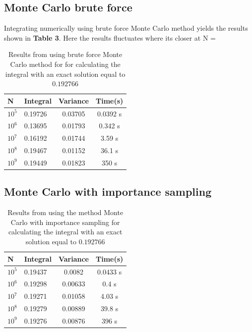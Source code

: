 \documentclass[twoside,twocolumn]{article}
\begin{document}
\subsection{Monte Carlo brute force}
Integrating numerically using brute force Monte Carlo method yields the results shown in \textbf{Table 3}. Here the results fluctuates where its closer at N = 
\begin{table}[h]
\centering
\begin{tabular}{|l|l|c|c|}
\hline
N                     & Integral & \multicolumn{1}{l|}{Variance} & Time(s)  \\ \hline
$10^5$ & 0.19726  & 0.03705                       & 0.0392 s \\ \hline
$10^6$ & 0.13695  & 0.01793                       & 0.342 s  \\ \hline
$10^7$ & 0.16192  & 0.01744                       & 3.59 s   \\ \hline
$10^8$ &0.19467  & 0.01152                       & 36.1 s   \\ \hline
$10^9$ & 0.19449  & 0.01823                       & 350 s    \\ \hline
\end{tabular}
\caption{Results from using brute force Monte Carlo method for for calculating the integral with an exact solution equal to $0.192766$}
\end{table}

\subsection{Monte Carlo with importance sampling}
\begin{table}[h]
\centering
\begin{tabular}{|l|l|c|c|}
\hline
N                     & Integral & \multicolumn{1}{l|}{Variance} & Time(s)  \\ \hline
$10^5$ & 0.19437  & 0.0082                        & 0.0433 s \\ \hline
$10^6$ & 0.19298  & 0.00633                       & 0.4 s    \\ \hline
$10^7$ & 0.19271  & 0.01058                       & 4.03 s   \\ \hline
$10^8$ & 0.19279  & 0.00889                       & 39.8 s   \\ \hline
$10^9$ & 0.19276  & 0.00876                       & 396 s    \\ \hline
\end{tabular}
\caption{Results from using the method Monte Carlo with importance sampling for calculating the integral with an exact solution equal to $0.192766$}
\end{table}
\end{document}
